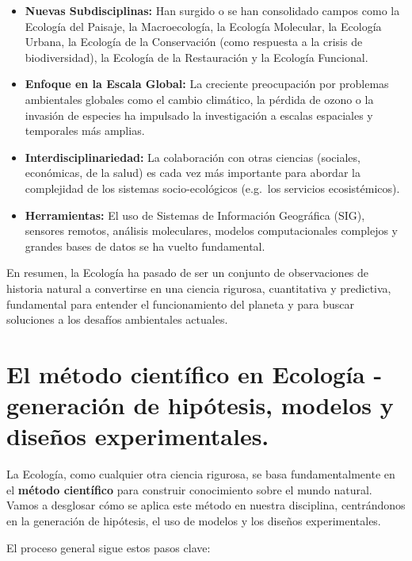 \documentclass[
]{book}
\begin{document}
\begin{itemize}
\item
  \textbf{Nuevas Subdisciplinas:} Han surgido o se han consolidado campos como la Ecología del Paisaje, la Macroecología, la Ecología Molecular, la Ecología Urbana, la Ecología de la Conservación (como respuesta a la crisis de biodiversidad), la Ecología de la Restauración y la Ecología Funcional.
\item
  \textbf{Enfoque en la Escala Global:} La creciente preocupación por problemas ambientales globales como el cambio climático, la pérdida de ozono o la invasión de especies ha impulsado la investigación a escalas espaciales y temporales más amplias.
\item
  \textbf{Interdisciplinariedad:} La colaboración con otras ciencias (sociales, económicas, de la salud) es cada vez más importante para abordar la complejidad de los sistemas socio-ecológicos (e.g.~los servicios ecosistémicos).
\item
  \textbf{Herramientas:} El uso de Sistemas de Información Geográfica (SIG), sensores remotos, análisis moleculares, modelos computacionales complejos y grandes bases de datos se ha vuelto fundamental.
\end{itemize}

En resumen, la Ecología ha pasado de ser un conjunto de observaciones de historia natural a convertirse en una ciencia rigurosa, cuantitativa y predictiva, fundamental para entender el funcionamiento del planeta y para buscar soluciones a los desafíos ambientales actuales.

\section*{El método científico en Ecología - generación de hipótesis, modelos y diseños experimentales.}\label{metodo}

La Ecología, como cualquier otra ciencia rigurosa, se basa fundamentalmente en el \textbf{método científico} para construir conocimiento sobre el mundo natural. Vamos a desglosar cómo se aplica este método en nuestra disciplina, centrándonos en la generación de hipótesis, el uso de modelos y los diseños experimentales.

El proceso general sigue estos pasos clave:
\end{document}
